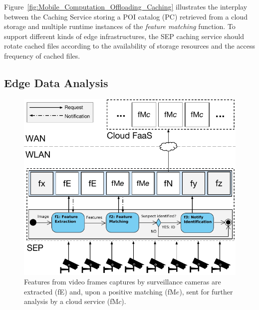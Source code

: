Figure~\ref{fig:Mobile_Computation_Offloading_Caching} illustrates the interplay between the Caching Service storing a POI catalog (PC) retrieved from a cloud storage and multiple runtime instances of the \textit{feature matching} function.
To support different kinds of edge infrastructures, the SEP caching service should rotate cached files according to the availability of storage resources and the access frequency of cached files. %


\subsection{Edge Data Analysis}

\begin{figure}[tbp]
	\centering
	\includegraphics[width=\linewidth]{Figs/Edge_Data_Analytics_Video_Surveillance.pdf}
	\caption{Features from video frames captures by surveillance cameras are extracted (fE) and, upon a positive matching (fM$e$), sent for further analysis by a cloud service (fM$c$).}
	\label{fig:Edge_Data_Analytics_Video_Surveillance}
\end{figure}

